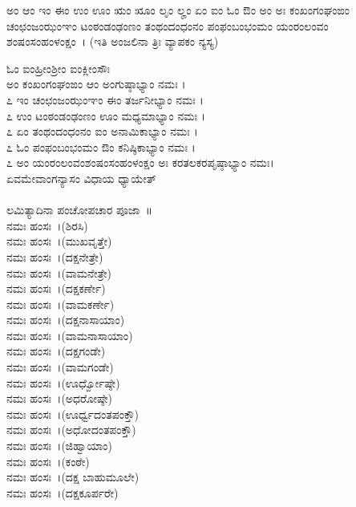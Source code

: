 ಅಂ ಆಂ ಇಂ ಈಂ ಉಂ ಊಂ ಋಂ ೠಂ ಲೃಂ ಲೄಂ ಏಂ ಐಂ ಓಂ ಔಂ ಅಂ ಅಃ ಕಂಖಂಗಂಘಂಙಂ ಚಂಛಂಜಂಝಂಞಂ ಟಂಠಂಡಂಢಂಣಂ ತಂಥಂದಂಧಂನಂ ಪಂಫಂಬಂಭಂಮಂ ಯಂರಂಲಂವಂ ಶಂಷಂಸಂಹಂಳಂಕ್ಷಂ~। (ಇತಿ ಅಂಜಲಿನಾ ತ್ರಿಃ ವ್ಯಾಪಕಂ ನ್ಯಸ್ಯ)

ಓಂ ಐಂಹ್ರೀಂಶ್ರೀಂ ಐಂಕ್ಲೀಂಸೌಃ\\ಅಂ ಕಂಖಂಗಂಘಂಙಂ ಆಂ ಅಂಗುಷ್ಠಾಭ್ಯಾಂ ನಮಃ ।\\
೭ ಇಂ ಚಂಛಂಜಂಝಂಞಂ ಈಂ ತರ್ಜನೀಭ್ಯಾಂ ನಮಃ ।\\
೭ ಉಂ ಟಂಠಂಡಂಢಂಣಂ ಊಂ ಮಧ್ಯಮಾಭ್ಯಾಂ ನಮಃ ।\\
೭ ಏಂ ತಂಥಂದಂಧಂನಂ ಐಂ ಅನಾಮಿಕಾಭ್ಯಾಂ ನಮಃ ।\\
೭ ಓಂ ಪಂಫಂಬಂಭಂಮಂ ಔಂ ಕನಿಷ್ಠಿಕಾಭ್ಯಾಂ ನಮಃ ।\\
೭ ಅಂ ಯಂರಂಲಂವಂಶಂಷಂಸಂಹಂಳಂಕ್ಷಂ ಅಃ ಕರತಲಕರಪೃಷ್ಠಾಭ್ಯಾಂ ನಮಃ।\\
ಏವಮೇವಾಂಗನ್ಯಾಸಂ ವಿಧಾಯ ಧ್ಯಾಯೇತ್ \\
\\
ಲಮಿತ್ಯಾದಿನಾ ಪಂಚೋಪಚಾರ ಪೂಜಾ~॥\\
 ನಮಃ ಹಂಸಃ~।(ಶಿರಸಿ)\\
 ನಮಃ ಹಂಸಃ~।(ಮುಖವೃತ್ತೇ)\\
 ನಮಃ ಹಂಸಃ~।(ದಕ್ಷನೇತ್ರೇ)\\
 ನಮಃ ಹಂಸಃ~।(ವಾಮನೇತ್ರೇ)\\
 ನಮಃ ಹಂಸಃ~।(ದಕ್ಷಕರ್ಣೇ)\\
 ನಮಃ ಹಂಸಃ~।(ವಾಮಕರ್ಣೇ)\\
 ನಮಃ ಹಂಸಃ~।(ದಕ್ಷನಾಸಾಯಾಂ)\\
 ನಮಃ ಹಂಸಃ~।(ವಾಮನಾಸಾಯಾಂ)\\
 ನಮಃ ಹಂಸಃ~।(ದಕ್ಷಗಂಡೇ)\\
 ನಮಃ ಹಂಸಃ~।(ವಾಮಗಂಡೇ)\\
 ನಮಃ ಹಂಸಃ~।(ಊರ್ಧ್ವೋಷ್ಠೇ)\\
 ನಮಃ ಹಂಸಃ~।(ಅಧರೋಷ್ಠೇ)\\
 ನಮಃ ಹಂಸಃ~।(ಊರ್ಧ್ವದಂತಪಂಕ್ತೌ)\\
 ನಮಃ ಹಂಸಃ~।(ಅಧೋದಂತಪಂಕ್ತೌ)\\
 ನಮಃ ಹಂಸಃ~।(ಜಿಹ್ವಾಯಾಂ)\\
 ನಮಃ ಹಂಸಃ~।(ಕಂಠೇ)\\
 ನಮಃ ಹಂಸಃ~।(ದಕ್ಷ ಬಾಹುಮೂಲೇ)\\
 ನಮಃ ಹಂಸಃ~।(ದಕ್ಷಕೂರ್ಪರೇ)\\
